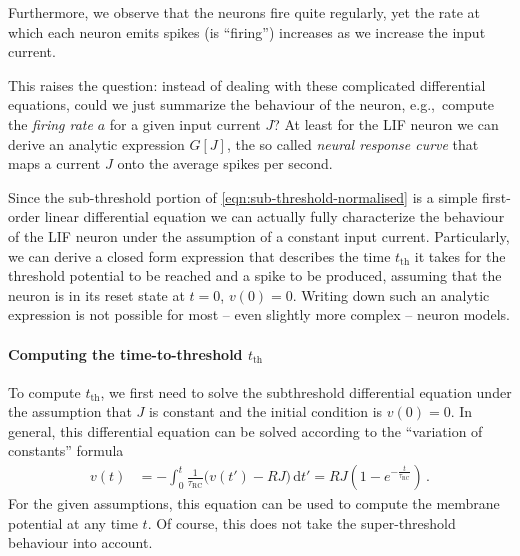 \documentclass[10pt,letterpaper,oneside]{article}
\begin{document}
Furthermore, we observe that the neurons fire quite regularly, yet the rate at which each neuron emits spikes (is \enquote{firing}) increases as we increase the input current.

This raises the question: instead of dealing with these complicated differential equations, could we just summarize the behaviour of the neuron, e.g.,~compute the \emph{firing rate} $a$ for a given input current $J$? At least for the LIF neuron we can derive an analytic expression $G[J]$, the so called \emph{neural response curve} that maps a current $J$ onto the average spikes per second.

\newpage


Since the sub-threshold portion of \cref{eqn:sub-threshold-normalised} is a simple first-order linear differential equation we can actually fully characterize the behaviour of the LIF neuron under the assumption of a constant input current. Particularly, we can derive a closed form expression that describes the time $t_\mathrm{th}$ it takes for the threshold potential to be reached and a spike to be produced, assuming that the neuron is in its reset state at $t=0$, $v(0) = 0$. Writing down such an analytic expression is not possible for most -- even slightly more complex -- neuron models.

\paragraph{Computing the time-to-threshold $t_\mathrm{th}$}
To compute $t_\mathrm{th}$, we first need to solve the subthreshold differential equation under the assumption that $J$ is constant and the initial condition is $v(0) = 0$. In general, this differential equation can be solved according to the \enquote{variation of constants} formula
\begin{align*}
	v(t) &= - \int_0^t \frac{1}{\tau_\mathrm{RC}} \big( v(t') - RJ \big) \,\mathrm{d}t'
	      = RJ \left(1 - e^{-\frac{t}{\tau_\mathrm{RC}}} \right) \,.
\end{align*}
For the given assumptions, this equation can be used to compute the membrane potential at any time $t$. Of course, this does not take the super-threshold behaviour into account.
\end{document}
